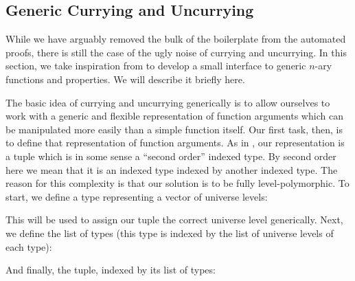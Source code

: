 \subsection{Generic Currying and Uncurrying}
While we have arguably removed the bulk of the boilerplate from the automated
proofs, there is still the case of the ugly noise of currying and uncurrying.
In this section, we take inspiration from
\citet{allaisGenericLevelPolymorphic2019} to develop a small interface to generic
\(n\)-ary functions and properties.
We will describe it briefly here.

The basic idea of currying and uncurrying generically is to allow ourselves to
work with a generic and flexible representation of function arguments which can
be manipulated more easily than a simple function itself.
Our first task, then, is to define that representation of function arguments.
As in \citet{allaisGenericLevelPolymorphic2019}, our representation is a tuple
which is in some sense a ``second order'' indexed type.
By second order here we mean that it is an indexed type indexed by another
indexed type.
The reason for this complexity is that our solution is to be fully
level-polymorphic.
To start, we define a type representing a vector of universe levels:

\begin{minipage}{\linewidth}
  \begin{multicols}{2}
    \begin{agdalisting*}
    \end{agdalisting*} \columnbreak
    \begin{agdalisting*}
    \end{agdalisting*} \vspace{\baselineskip}
  \end{multicols}
\end{minipage}

This will be used to assign our tuple the correct universe level generically.
Next, we define the list of types (this type is indexed by the list of universe
levels of each type):
\begin{agdalisting*}
\end{agdalisting*}
And finally, the tuple, indexed by its list of types:

